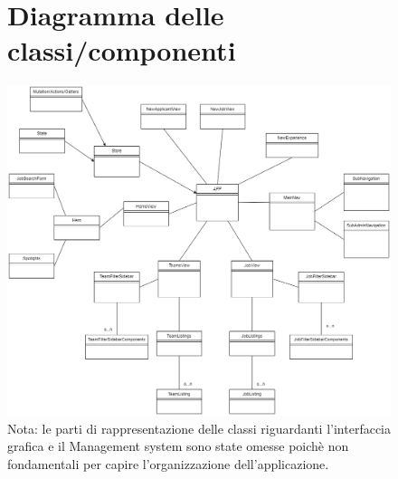 \documentclass[ 4paper,11pt,openany]{book}
\begin{document}
\begin{figure}[htpb!] 
	\section{Diagramma delle classi/componenti}
	\centering 
	\includegraphics[width=185mm]{Complete_Class_diagram.png}
	Nota: le parti di rappresentazione delle classi riguardanti l'interfaccia grafica e il Management system sono state omesse poichè non fondamentali per capire l'organizzazione dell'applicazione.
\end{figure}
\end{document}
